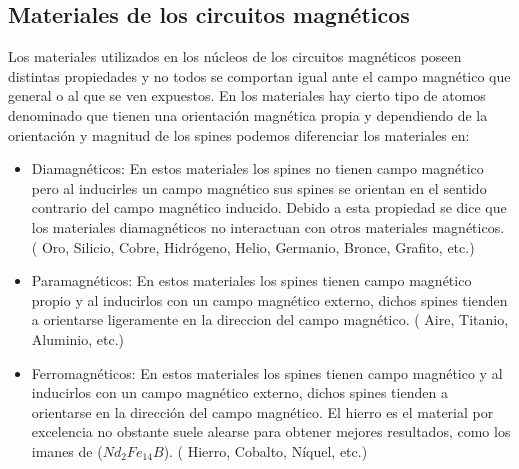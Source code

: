 \documentclass{report}
\begin{document}
  \subsection{Materiales de los circuitos magnéticos}\label{ssec:materiales_circuitos_magneticos}
Los materiales utilizados en los núcleos de los circuitos magnéticos poseen distintas propiedades
y no todos se comportan igual ante el campo magnético que general o al que se ven expuestos.
En los materiales hay cierto tipo de atomos denominado  que tienen una orientación magnética propia
y dependiendo de la orientación y magnitud de los spines podemos diferenciar los materiales en:
\begin{itemize}
  
  \item{Diamagnéticos: }
    En estos materiales los spines no tienen campo magnético pero al inducirles un campo magnético sus spines se orientan en el sentido contrario
    del campo magnético inducido. Debido a esta propiedad se dice que los materiales diamagnéticos no interactuan con otros materiales magnéticos.
    \newline( Oro, Silicio, Cobre, Hidrógeno, Helio, Germanio, Bronce, Grafito, etc.)
  
  \item{Paramagnéticos: } 
    En estos materiales los spines tienen campo magnético propio y al inducirlos con un campo magnético externo, dichos spines tienden a orientarse
    ligeramente en la direccion del campo magnético.
    \newline( Aire, Titanio, Aluminio, etc.)
 
  \item{Ferromagnéticos: }
    En estos materiales los spines tienen campo magnético y al inducirlos con un campo magnético externo, 
    dichos spines tienden a orientarse en la dirección del campo magnético. El hierro es el material por excelencia
    no obstante suele alearse para obtener mejores resultados, como los imanes de  (\(Nd_2Fe_{14}B\)).
    \newline( Hierro, Cobalto, Níquel, etc.)
\end{itemize}
\end{document}
